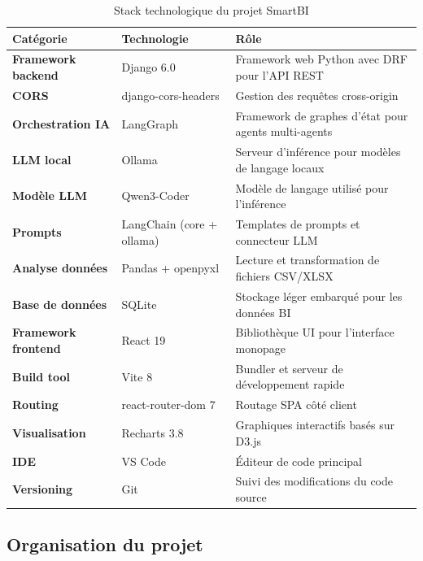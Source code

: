 \begin{table}[H]
\centering
\renewcommand{\arraystretch}{1.4} %
\caption{Stack technologique du projet SmartBI}
\label{tab:technologies}
\begin{tabularx}{\textwidth}{
    >{\raggedright\arraybackslash\bfseries}l 
    >{\raggedright\arraybackslash}l 
    >{\raggedright\arraybackslash}X
}
\toprule
\textbf{Catégorie} & \textbf{Technologie} & \textbf{Rôle} \\
\midrule
Framework backend  & Django 6.0                 & Framework web Python avec DRF pour l'API REST \\
CORS               & django-cors-headers       & Gestion des requêtes cross-origin \\
Orchestration IA   & LangGraph                  & Framework de graphes d'état pour agents multi-agents \\
LLM local          & Ollama                     & Serveur d'inférence pour modèles de langage locaux \\
Modèle LLM         & Qwen3-Coder                & Modèle de langage utilisé pour l'inférence \\
Prompts            & LangChain (core + ollama)  & Templates de prompts et connecteur LLM \\
Analyse données    & Pandas + openpyxl          & Lecture et transformation de fichiers CSV/XLSX \\
Base de données    & SQLite                     & Stockage léger embarqué pour les données BI \\
Framework frontend & React 19                   & Bibliothèque UI pour l'interface monopage \\
Build tool         & Vite 8                     & Bundler et serveur de développement rapide \\
Routing            & react-router-dom 7         & Routage SPA côté client \\
Visualisation      & Recharts 3.8               & Graphiques interactifs basés sur D3.js \\
IDE                & VS Code                    & Éditeur de code principal \\
Versioning         & Git                        & Suivi des modifications du code source \\
\bottomrule
\end{tabularx}
\end{table}

\subsection{Organisation du projet}

